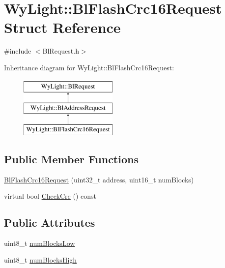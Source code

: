 \hypertarget{struct_wy_light_1_1_bl_flash_crc16_request}{\section{Wy\-Light\-:\-:Bl\-Flash\-Crc16\-Request Struct Reference}
\label{struct_wy_light_1_1_bl_flash_crc16_request}
}


{\ttfamily \#include $<$Bl\-Request.\-h$>$}

Inheritance diagram for Wy\-Light\-:\-:Bl\-Flash\-Crc16\-Request\-:\begin{figure}[H]
\begin{center}
\leavevmode
\includegraphics[height=3.000000cm]{struct_wy_light_1_1_bl_flash_crc16_request}
\end{center}
\end{figure}
\subsection*{Public Member Functions}
\begin{DoxyCompactItemize}
\item 
\hyperlink{struct_wy_light_1_1_bl_flash_crc16_request_a532917f2e6d2a7c3b44c9d9f6691bcfa}{Bl\-Flash\-Crc16\-Request} (uint32\-\_\-t address, uint16\-\_\-t num\-Blocks)
\item 
virtual bool \hyperlink{struct_wy_light_1_1_bl_flash_crc16_request_a7a3a14722ed86688b5992f84089adc3c}{Check\-Crc} () const 
\end{DoxyCompactItemize}
\subsection*{Public Attributes}
\begin{DoxyCompactItemize}
\item 
uint8\-\_\-t \hyperlink{struct_wy_light_1_1_bl_flash_crc16_request_ae203ed160c58cf31e6395fd3c1e7560b}{num\-Blocks\-Low}
\item 
uint8\-\_\-t \hyperlink{struct_wy_light_1_1_bl_flash_crc16_request_a336dd15d053c5e7330a638de12141b35}{num\-Blocks\-High}
\end{DoxyCompactItemize}


